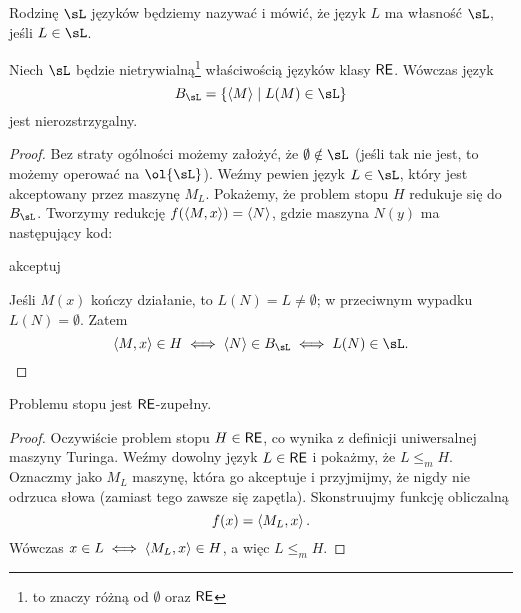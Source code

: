 Rodzinę $\sL$ języków będziemy nazywać  i mówić, że język $L$ ma własność $\sL$, jeśli $L \in \sL$.

\begin{theorem}[Rice'a]
    Niech $\sL$ będzie nietrywialną\footnote{to znaczy różną od $\emptyset$ oraz $\textsf{RE}$} właściwością języków klasy $\textsf{RE}$. Wówczas język
    \[ B_{\sL} = \{\encode{M} \mid L(M) \in \sL\} \]
    jest nierozstrzygalny.
\end{theorem}
\begin{proof}
    Bez straty ogólności możemy założyć, że $\emptyset \notin \sL$ (jeśli tak nie jest, to możemy operować na $\ol{\sL}$). Weźmy pewien język $L \in \sL$, który jest akceptowany przez maszynę $M_L$. Pokażemy, że problem stopu $H$ redukuje się do $B_{\sL}$. Tworzymy redukcję $f(\left\langle M, x \right\rangle) = \left\langle N \right\rangle$, gdzie maszyna $N(y)$ ma następujący kod:
    \begin{algorithmic}
                \State akceptuj
            \EndIf
        \EndIf
    \end{algorithmic}
    Jeśli $M(x)$ kończy działanie, to $L(N) = L \neq \emptyset$; w przeciwnym wypadku $L(N) = \emptyset$. Zatem
    \[ \encode{M, x} \in H \iff \encode{N} \in B_{\sL} \iff L(N) \in \sL. \]
\end{proof}

\begin{theorem}\label{t:halting is RE-complete}
    Problemu stopu jest $\textsf{RE}$-zupełny.
\end{theorem}
\begin{proof}
    Oczywiście problem stopu $H \in \textsf{RE}$, co wynika z definicji uniwersalnej maszyny Turinga. Weźmy dowolny język $L \in \textsf{RE}$ i pokażmy, że $L \leq_m H$. Oznaczmy jako $M_L$ maszynę, która go akceptuje i przyjmijmy, że nigdy nie odrzuca słowa (zamiast tego zawsze się zapętla). Skonstruujmy funkcję obliczalną
    \[ f(x) = \left\langle M_L, x \right\rangle. \]
    Wówczas $x \in L \iff \left\langle M_L, x \right\rangle \in H$, a więc $L \leq_m H$.
\end{proof}

